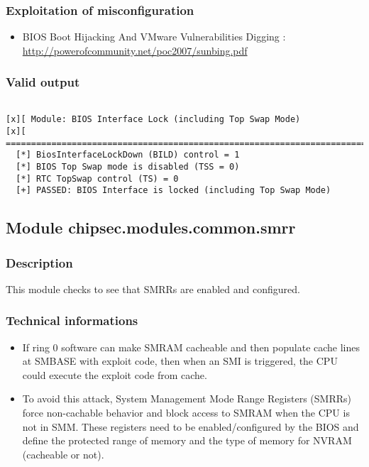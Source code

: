 \hypertarget{exploitation-of-misconfiguration-1}{%
\subsubsection{Exploitation of
misconfiguration}\label{exploitation-of-misconfiguration-1}}

\begin{itemize}
\tightlist
\item
  BIOS Boot Hijacking And VMware Vulnerabilities Digging :
  \url{http://powerofcommunity.net/poc2007/sunbing.pdf}
\end{itemize}

\hypertarget{valid-output-5}{%
\subsubsection{Valid output}\label{valid-output-5}}

\begin{verbatim}

[x][ Module: BIOS Interface Lock (including Top Swap Mode)
[x][ =======================================================================
  [*] BiosInterfaceLockDown (BILD) control = 1
  [*] BIOS Top Swap mode is disabled (TSS = 0)
  [*] RTC TopSwap control (TS) = 0
  [+] PASSED: BIOS Interface is locked (including Top Swap Mode)
\end{verbatim}

\hypertarget{module-chipsec.modules.common.smrr}{%
\subsection{Module
chipsec.modules.common.smrr}\label{module-chipsec.modules.common.smrr}}

\hypertarget{description-6}{%
\subsubsection{Description}\label{description-6}}

This module checks to see that SMRRs are enabled and configured.

\hypertarget{technical-informations-6}{%
\subsubsection{Technical informations}\label{technical-informations-6}}

\begin{itemize}
\tightlist
\item
  If ring 0 software can make SMRAM cacheable and then populate cache
  lines at SMBASE with exploit code, then when an SMI is triggered, the
  CPU could execute the exploit code from cache.
\item
  To avoid this attack, System Management Mode Range Registers (SMRRs)
  force non-cachable behavior and block access to SMRAM when the CPU is
  not in SMM. These registers need to be enabled/configured by the BIOS
  and define the protected range of memory and the type of memory for
  NVRAM (cacheable or not).
\end{itemize}

